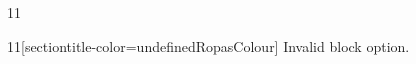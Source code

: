 \documentclass[paper=A4]{ropas-poster}
\begin{document}
\begin{postergrid}{1}{1}
\begin{posterblock}{1}{1}[sectiontitle-color=undefinedRopasColour]
Invalid block option.
\end{posterblock}
\end{postergrid}
\end{document}
